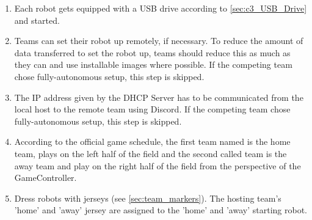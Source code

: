 \begin{enumerate}
		\item Each robot gets equipped with a USB drive according to \ref{sec:c3_USB_Drive} and started.
        \item Teams can set their robot up remotely, if necessary. To reduce the amount of data transferred to set the robot up, teams should reduce this as much as they can and use installable images where possible. If the competing team chose fully-autonomous setup, this step is skipped.
        \item The IP address given by the DHCP Server has to be communicated from the local host to the remote team using Discord. If the competing team chose fully-autonomous setup, this step is skipped.
        \item According to the official game schedule, the first team named is the home team, plays on the left half of the field and the second called team is the away team and play on the right half of the field from the perspective of the GameController. 
        \item Dress robots with jerseys (see \ref{sec:team_markers}). The hosting team's 'home' and 'away' jersey are assigned to the 'home' and 'away' starting robot. 
    \end{enumerate}

